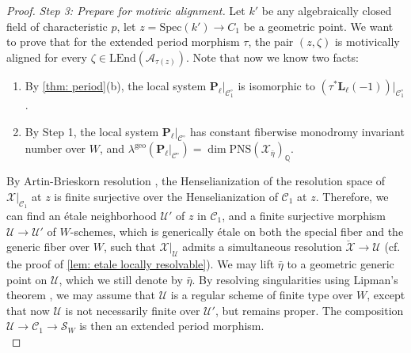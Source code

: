 \documentclass[11pt, letterpaper]{amsart}
\theoremstyle{plain}
\theoremstyle{definition}
\newcommand{\IQ}{\mathbb{Q}}
\newcommand{\sC}{\mathcal{C}}
\newcommand{\Spec}{\mathrm{Spec}}
\newcommand{\<}{\langle}
\renewcommand{\>}{\rangle}
\newcommand{\sU}{\mathcal{U}}
\newcommand{\shS}{\mathscr{S}}
\newcommand{\sA}{\mathcal{A}}
\newcommand{\sX}{\mathcal{X}}
\newcommand{\bL}{\mathbf{L}}
\newcommand{\LEnd}{\mathrm{LEnd}}
\newcommand{\PNS}{\mathrm{PNS}}
\newcommand{\bP}{\mathbf{P}}
\newcommand{\geo}{{\mathrm{geo}}}
\begin{document}
\begin{proof}
    \noindent \textit{Step 3: Prepare for motivic alignment.} Let $k'$ be any algebraically closed field of characteristic $p$, let $z=\Spec(k') \to C_1$ be a geometric point.
		We want to prove that for the extended period morphism $\tau$, the pair $(z, \zeta)$ is motivically aligned for every $\zeta \in \LEnd(\sA_{\tau(z)})$. 
		Note that now we know two facts: 
		\begin{enumerate}[label=\upshape{(\roman*)}]
			\item By \cref{thm: period}(b), the local system $\bP_\ell |_{\sC_1^\circ}$ is isomorphic to $(\tau^* \bL_\ell(-1))|_{\sC_1^\circ}$. 
			\item By Step 1, the local system $\bP_{\ell}|_{\sC^\circ}$ has constant fiberwise monodromy invariant number over $W$, and $\lambda^{\geo}(\bP_{\ell}|_{\sC^\circ}) = \dim \PNS(\sX_{\bar{\eta}})_\IQ$. 
		\end{enumerate}
        By Artin-Brieskorn resolution \cite[p.322]{Artin-Res}, the Henselianization of the resolution space of $\sX|_{\sC_1}$ at $z$ is finite surjective over the Henselianization of $\sC_1$ at $z$. Therefore, we can find an \'etale neighborhood $\sU'$ of $z$ in $\sC_1$, and a finite surjective morphism $\sU \to \sU'$ of $W$-schemes, which is generically \'etale on both the special fiber and the generic fiber over $W$, such that $\sX|_\sU$ admits a simultaneous resolution $\breve{\sX} \to \sU$ (cf. the proof of \cref{lem: etale locally resolvable}). 
		We may lift $\bar{\eta}$ to a geometric generic point on $\sU$, which we still denote by $\bar{\eta}$. 
        By resolving singularities using Lipman's theorem \cite[\href{https://stacks.math.columbia.edu/tag/0ADX}{Tag 0ADX}, \href{https://stacks.math.columbia.edu/tag/0BGP}{0BGP}]{stacks-project}, we may assume that $\sU$ is a regular scheme of finite type over $W$, except that now $\sU$ is not necessarily finite over $\sU'$, but remains proper. 
        The composition $\sU \to \sC_1 \to \shS_W$ is then an extended period morphism. \\


\end{proof}
\end{document}
